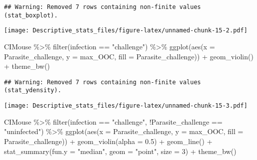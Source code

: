 \documentclass[
]{article}
\newenvironment{Shaded}{\begin{snugshade}}{\end{snugshade}}
\newcommand{\AttributeTok}[1]{\textcolor[rgb]{0.77,0.63,0.00}{#1}}
\newcommand{\DecValTok}[1]{\textcolor[rgb]{0.00,0.00,0.81}{#1}}
\newcommand{\FloatTok}[1]{\textcolor[rgb]{0.00,0.00,0.81}{#1}}
\newcommand{\FunctionTok}[1]{\textcolor[rgb]{0.00,0.00,0.00}{#1}}
\newcommand{\NormalTok}[1]{#1}
\newcommand{\SpecialCharTok}[1]{\textcolor[rgb]{0.00,0.00,0.00}{#1}}
\newcommand{\StringTok}[1]{\textcolor[rgb]{0.31,0.60,0.02}{#1}}
\begin{document}
\begin{verbatim}
## Warning: Removed 7 rows containing non-finite values (stat_boxplot).
\end{verbatim}

\texttt{[image: Descriptive\_stats\_files/figure-latex/unnamed-chunk-15-2.pdf]}

\begin{Shaded}
\begin{Highlighting}[]
\NormalTok{CIMouse  }\SpecialCharTok{\%\textgreater{}\%}
    \FunctionTok{filter}\NormalTok{(infection }\SpecialCharTok{==} \StringTok{"challenge"}\NormalTok{)  }\SpecialCharTok{\%\textgreater{}\%}
  \FunctionTok{ggplot}\NormalTok{(}\FunctionTok{aes}\NormalTok{(}\AttributeTok{x =}\NormalTok{ Parasite\_challenge, }\AttributeTok{y =}\NormalTok{ max\_OOC, }\AttributeTok{fill =}\NormalTok{ Parasite\_challenge)) }\SpecialCharTok{+}
  \FunctionTok{geom\_violin}\NormalTok{() }\SpecialCharTok{+}
    \FunctionTok{theme\_bw}\NormalTok{() }
\end{Highlighting}
\end{Shaded}

\begin{verbatim}
## Warning: Removed 7 rows containing non-finite values (stat_ydensity).
\end{verbatim}

\texttt{[image: Descriptive\_stats\_files/figure-latex/unnamed-chunk-15-3.pdf]}

\begin{Shaded}
\begin{Highlighting}[]
\NormalTok{CIMouse  }\SpecialCharTok{\%\textgreater{}\%}
    \FunctionTok{filter}\NormalTok{(infection }\SpecialCharTok{==} \StringTok{"challenge"}\NormalTok{, }\SpecialCharTok{!}\NormalTok{Parasite\_challenge }\SpecialCharTok{==} \StringTok{"uninfected"}\NormalTok{)  }\SpecialCharTok{\%\textgreater{}\%}
  \FunctionTok{ggplot}\NormalTok{(}\FunctionTok{aes}\NormalTok{(}\AttributeTok{x =}\NormalTok{ Parasite\_challenge, }\AttributeTok{y =}\NormalTok{ max\_OOC, }\AttributeTok{fill =}\NormalTok{ Parasite\_challenge)) }\SpecialCharTok{+}
  \FunctionTok{geom\_violin}\NormalTok{(}\AttributeTok{alpha =} \FloatTok{0.5}\NormalTok{) }\SpecialCharTok{+}
    \FunctionTok{geom\_line}\NormalTok{() }\SpecialCharTok{+}
     \FunctionTok{stat\_summary}\NormalTok{(}\AttributeTok{fun.y =} \StringTok{"median"}\NormalTok{, }\AttributeTok{geom =} \StringTok{"point"}\NormalTok{, }\AttributeTok{size =} \DecValTok{3}\NormalTok{) }\SpecialCharTok{+}
    \FunctionTok{theme\_bw}\NormalTok{() }
\end{Highlighting}
\end{Shaded}
\end{document}
